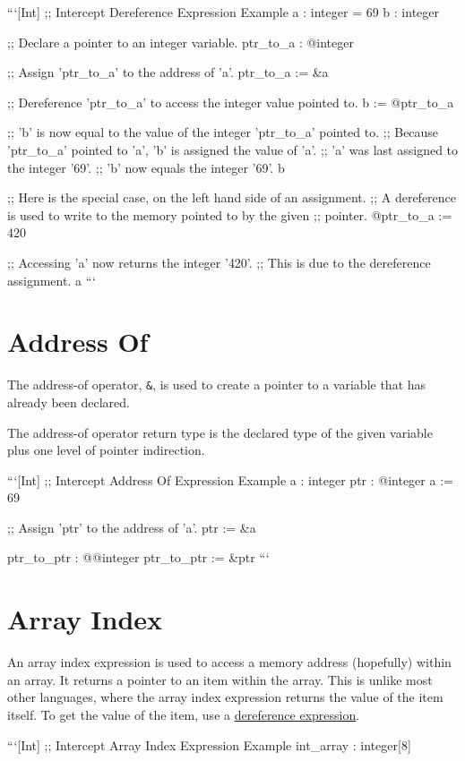 \documentclass[12pt]{report}
\begin{document}
```[Int]
;; Intercept Dereference Expression Example
a : integer = 69
b : integer

;; Declare a pointer to an integer variable.
ptr_to_a : @integer

;; Assign 'ptr_to_a' to the address of 'a'.
ptr_to_a := &a

;; Dereference 'ptr_to_a' to access the integer value pointed to.
b := @ptr_to_a

;; 'b' is now equal to the value of the integer 'ptr_to_a' pointed to.
;; Because 'ptr_to_a' pointed to 'a', 'b' is assigned the value of 'a'.
;; 'a' was last assigned to the integer '69'.
;; 'b' now equals the integer '69'.
b

;; Here is the special case, on the left hand side of an assignment.
;; A dereference is used to write to the memory pointed to by the given
;; pointer.
@ptr_to_a := 420

;; Accessing 'a' now returns the integer '420'.
;; This is due to the dereference assignment.
a
```

\section{Address Of}
\label{sec:expressions-address_of}

The address-of operator, \verb|&|, is used to create a pointer to a variable that has already been declared.

The address-of operator return type is the declared type of the given variable plus one level of pointer indirection.

```[Int]
;; Intercept Address Of Expression Example
a : integer
ptr : @integer
a   := 69

;; Assign 'ptr' to the address of 'a'.
ptr := &a

ptr_to_ptr : @@integer
ptr_to_ptr := &ptr
```

\section{Array Index}
\label{sec:expressions-array_index}

An array index expression is used to access a memory address (hopefully) within an array. It returns a pointer to an item within the array. This is unlike most other languages, where the array index expression returns the value of the item itself. To get the value of the item, use a \hyperref[sec:expressions-dereference]{dereference expression}.

```[Int]
;; Intercept Array Index Expression Example
int_array : integer[8]
\end{document}
